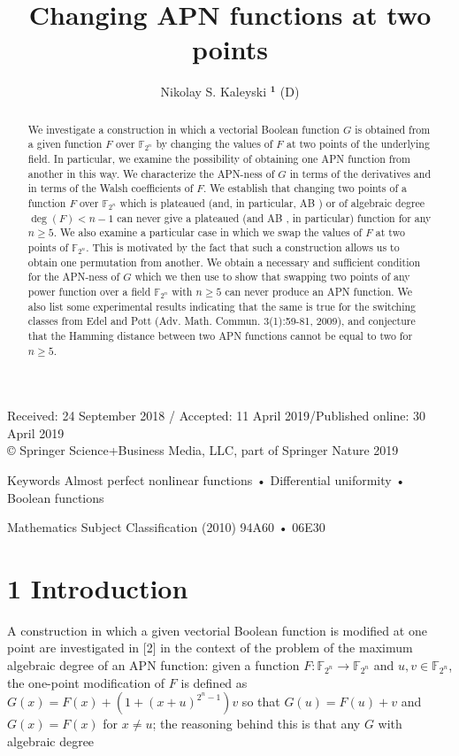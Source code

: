\documentclass[10pt]{article}
\title{Changing APN functions at two points }
\author{Nikolay S. Kaleyski ${ }^{\mathbf{1}}$ (D)}
\date{}
\begin{document}
\maketitle
\captionsetup{singlelinecheck=false}
Received: 24 September 2018 / Accepted: 11 April 2019/Published online: 30 April 2019\\
© Springer Science+Business Media, LLC, part of Springer Nature 2019

\begin{abstract}
We investigate a construction in which a vectorial Boolean function $G$ is obtained from a given function $F$ over $\mathbb{F}_{2^{n}}$ by changing the values of $F$ at two points of the underlying field. In particular, we examine the possibility of obtaining one APN function from another in this way. We characterize the APN-ness of $G$ in terms of the derivatives and in terms of the Walsh coefficients of $F$. We establish that changing two points of a function $F$ over $\mathbb{F}_{2^{n}}$ which is plateaued (and, in particular, AB ) or of algebraic degree $\operatorname{deg}(F)<n-1$ can never give a plateaued (and AB , in particular) function for any $n \geq 5$. We also examine a particular case in which we swap the values of $F$ at two points of $\mathbb{F}_{2^{n}}$. This is motivated by the fact that such a construction allows us to obtain one permutation from another. We obtain a necessary and sufficient condition for the APN-ness of $G$ which we then use to show that swapping two points of any power function over a field $\mathbb{F}_{2^{n}}$ with $n \geq 5$ can never produce an APN function. We also list some experimental results indicating that the same is true for the switching classes from Edel and Pott (Adv. Math. Commun. 3(1):59-81, 2009), and conjecture that the Hamming distance between two APN functions cannot be equal to two for $n \geq 5$.
\end{abstract}

Keywords Almost perfect nonlinear functions • Differential uniformity • Boolean functions

Mathematics Subject Classification (2010) 94A60 • 06E30

\section*{1 Introduction}
A construction in which a given vectorial Boolean function is modified at one point are investigated in [2] in the context of the problem of the maximum algebraic degree of an APN function: given a function $F: \mathbb{F}_{2^{n}} \rightarrow \mathbb{F}_{2^{n}}$ and $u, v \in \mathbb{F}_{2^{n}}$, the one-point modification of $F$ is defined as $G(x)=F(x)+\left(1+(x+u)^{2^{n}-1}\right) v$ so that $G(u)=F(u)+v$ and $G(x)=F(x)$ for $x \neq u$; the reasoning behind this is that any $G$ with algebraic degree
\end{document}

